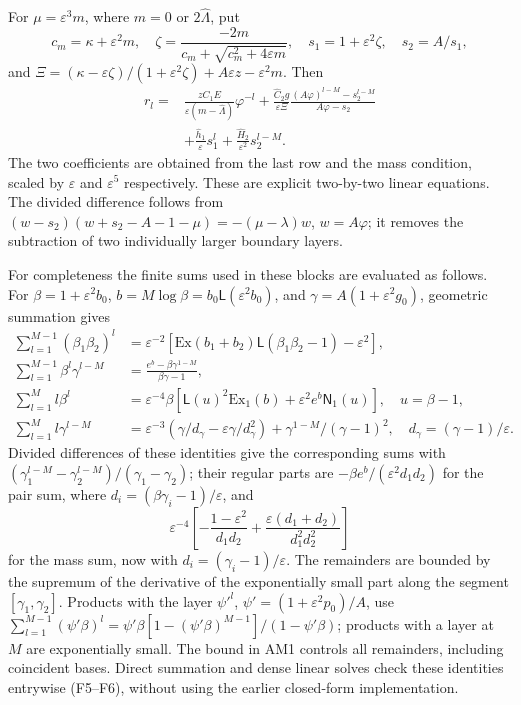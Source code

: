 For $\mu=\varepsilon^3m$, where $m=0$ or $2\widehat\Lambda$, put
\[
 c_m=\kappa+\varepsilon^2m,\quad
 \zeta=\frac{-2m}{c_m+\sqrt{c_m^2+4\varepsilon m}},\quad
 s_1=1+\varepsilon^2\zeta,\quad s_2=A/s_1,
\]
and $\Xi=(\kappa-\varepsilon\zeta)/(1+\varepsilon^2\zeta)+A\varepsilon z-\varepsilon^2m$.
Then
\begin{align*}
 r_l={}&\frac{zC_1E}{\varepsilon(m-\widehat\Lambda)}\varphi^{-l}
 +\frac{\widehat C_2g}{\varepsilon\Xi}
       \frac{(A\varphi)^{l-M}-s_2^{l-M}}{A\varphi-s_2}\\
 &+\frac{\widehat h_1}{\varepsilon}s_1^l
       +\frac{\widehat H_2}{\varepsilon^2}s_2^{l-M}.
\end{align*}
The two coefficients are obtained from the last row and the mass condition, scaled
by $\varepsilon$ and $\varepsilon^5$ respectively. These are explicit two-by-two linear
equations. The divided difference follows from
$(w-s_2)(w+s_2-A-1-\mu)=-(\mu-\lambda)w$, $w=A\varphi$;
it removes the subtraction of two individually larger boundary layers.

For completeness the finite sums used in these blocks are evaluated as follows.
For $\beta=1+\varepsilon^2b_0$, $b=M\log\beta=b_0\mathsf L(\varepsilon^2b_0)$,
and $\gamma=A(1+\varepsilon^2g_0)$, geometric summation gives
\begin{align*}
 \sum_{l=1}^{M-1}(\beta_1\beta_2)^l
    &=\varepsilon^{-2}[\mathrm{Ex}(b_1+b_2)\mathsf L(\beta_1\beta_2-1)-\varepsilon^2],\\
 \sum_{l=1}^{M-1}\beta^l\gamma^{l-M}
    &=\frac{e^b-\beta\gamma^{1-M}}{\beta\gamma-1},\\
 \sum_{l=1}^{M}l\beta^l
    &=\varepsilon^{-4}\beta[\mathsf L(u)^2\mathrm{Ex}_1(b)
                              +\varepsilon^2e^b\mathsf N_1(u)],\quad u=\beta-1,\\
 \sum_{l=1}^{M}l\gamma^{l-M}
    &=\varepsilon^{-3}(\gamma/d_\gamma-\varepsilon\gamma/d_\gamma^2)
                              +\gamma^{1-M}/(\gamma-1)^2,
 \quad d_\gamma=(\gamma-1)/\varepsilon.
\end{align*}
Divided differences of these identities give the corresponding sums with
$(\gamma_1^{l-M}-\gamma_2^{l-M})/(\gamma_1-\gamma_2)$; their regular parts are
$-\beta e^b/(\varepsilon^2d_1d_2)$ for the pair sum, where
$d_i=(\beta\gamma_i-1)/\varepsilon$, and
\[
 \varepsilon^{-4}\left[-\frac{1-\varepsilon^2}{d_1d_2}
       +\frac{\varepsilon(d_1+d_2)}{d_1^2d_2^2}\right]
\]
for the mass sum, now with $d_i=(\gamma_i-1)/\varepsilon$.
The remainders are bounded by the supremum of the derivative of the exponentially small
part along the segment $[\gamma_1,\gamma_2]$. Products with the layer
$\psi'^l$, $\psi'=(1+\varepsilon^2p_0)/A$, use
$\sum_{l=1}^{M-1}(\psi'\beta)^l=\psi'\beta[1-(\psi'\beta)^{M-1}]/(1-\psi'\beta)$;
products with a layer at $M$ are exponentially small. The bound in AM1 controls all
remainders, including coincident bases. Direct summation and dense linear solves check
these identities entrywise (F5--F6), without using the earlier closed-form implementation.

